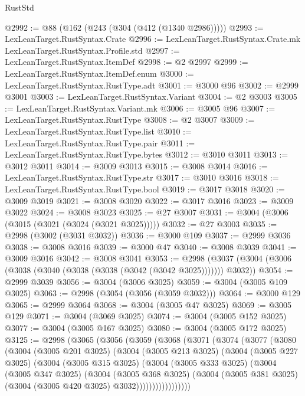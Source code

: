 \begin{lexlean}{RustStd}
\begin{coremodule}
@2992 := @88 (@162 (@243 (@304 (@412 (@1340 @2986)))))
@2993 := LexLeanTarget.RustSyntax.Crate
@2996 := LexLeanTarget.RustSyntax.Crate.mk LexLeanTarget.RustSyntax.Profile.std
@2997 := LexLeanTarget.RustSyntax.ItemDef
@2998 := @2 @2997
@2999 := LexLeanTarget.RustSyntax.ItemDef.enum
@3000 := LexLeanTarget.RustSyntax.RustType.adt
@3001 := @3000 @96
@3002 := @2999 @3001
@3003 := LexLeanTarget.RustSyntax.Variant
@3004 := @2 @3003
@3005 := LexLeanTarget.RustSyntax.Variant.mk
@3006 := @3005 @96
@3007 := LexLeanTarget.RustSyntax.RustType
@3008 := @2 @3007
@3009 := LexLeanTarget.RustSyntax.RustType.list
@3010 := LexLeanTarget.RustSyntax.RustType.pair
@3011 := LexLeanTarget.RustSyntax.RustType.bytes
@3012 := @3010 @3011
@3013 := @3012 @3011
@3014 := @3009 @3013
@3015 := @3008 @3014
@3016 := LexLeanTarget.RustSyntax.RustType.str
@3017 := @3010 @3016
@3018 := LexLeanTarget.RustSyntax.RustType.bool
@3019 := @3017 @3018
@3020 := @3009 @3019
@3021 := @3008 @3020
@3022 := @3017 @3016
@3023 := @3009 @3022
@3024 := @3008 @3023
@3025 := @27 @3007
@3031 := @3004 (@3006 (@3015 (@3021 (@3024 (@3021 @3025)))))
@3032 := @27 @3003
@3035 := @2998 (@3002 (@3031 @3032))
@3036 := @3000 @109
@3037 := @2999 @3036
@3038 := @3008 @3016
@3039 := @3000 @47
@3040 := @3008 @3039
@3041 := @3009 @3016
@3042 := @3008 @3041
@3053 := @2998 (@3037 (@3004 (@3006 (@3038 (@3040 (@3038 (@3038 (@3042 (@3042 @3025))))))) @3032))
@3054 := @2999 @3039
@3056 := @3004 (@3006 @3025)
@3059 := @3004 (@3005 @109 @3025)
@3063 := @2998 (@3054 (@3056 (@3059 @3032)))
@3064 := @3000 @129
@3065 := @2999 @3064
@3068 := @3004 (@3005 @47 @3025)
@3069 := @3005 @129
@3071 := @3004 (@3069 @3025)
@3074 := @3004 (@3005 @152 @3025)
@3077 := @3004 (@3005 @167 @3025)
@3080 := @3004 (@3005 @172 @3025)
@3125 := @2998
    (@3065
      (@3056
        (@3059
          (@3068
            (@3071
              (@3074
                (@3077
                  (@3080
                    (@3004
                      (@3005 @201 @3025)
                      (@3004
                        (@3005 @213 @3025)
                        (@3004
                          (@3005 @227 @3025)
                          (@3004
                            (@3005 @315 @3025)
                            (@3004
                              (@3005 @333 @3025)
                              (@3004
                                (@3005 @347 @3025)
                                (@3004
                                  (@3005 @368 @3025)
                                  (@3004
                                    (@3005 @381 @3025)
                                    (@3004 (@3005 @420 @3025) @3032)))))))))))))))))

\end{coremodule}
\end{lexlean}
